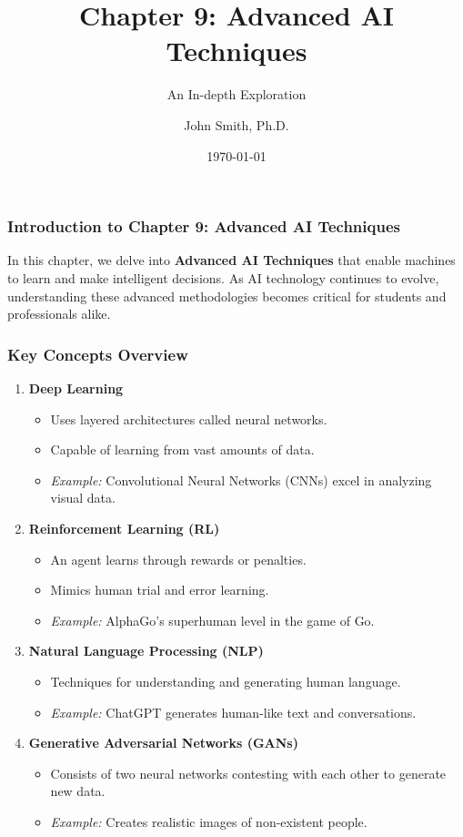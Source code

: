 \documentclass[aspectratio=169]{beamer}
\title[Advanced AI Techniques]{Chapter 9: Advanced AI Techniques}
\subtitle{An In-depth Exploration}
\author[J. Smith]{John Smith, Ph.D.}
\institute[University Name]{
  Department of Computer Science\\
  University Name\\
  \vspace{0.3cm}
  Email: email@university.edu\\
  Website: www.university.edu
}
\date{\today}
\begin{document}
\frame{\titlepage}

\begin{frame}[fragile]
    \frametitle{Introduction to Chapter 9: Advanced AI Techniques}
    In this chapter, we delve into \textbf{Advanced AI Techniques} that enable machines to learn and make intelligent decisions. 
    As AI technology continues to evolve, understanding these advanced methodologies becomes critical for students and professionals alike.
\end{frame}

\begin{frame}[fragile]
    \frametitle{Key Concepts Overview}
    \begin{enumerate}
        \item \textbf{Deep Learning}
            \begin{itemize}
                \item Uses layered architectures called neural networks.
                \item Capable of learning from vast amounts of data.
                \item \textit{Example:} Convolutional Neural Networks (CNNs) excel in analyzing visual data.
            \end{itemize}
        
        \item \textbf{Reinforcement Learning (RL)}
            \begin{itemize}
                \item An agent learns through rewards or penalties.
                \item Mimics human trial and error learning.
                \item \textit{Example:} AlphaGo's superhuman level in the game of Go.
            \end{itemize}
        
        \item \textbf{Natural Language Processing (NLP)}
            \begin{itemize}
                \item Techniques for understanding and generating human language.
                \item \textit{Example:} ChatGPT generates human-like text and conversations.
            \end{itemize}
        
        \item \textbf{Generative Adversarial Networks (GANs)}
            \begin{itemize}
                \item Consists of two neural networks contesting with each other to generate new data.
                \item \textit{Example:} Creates realistic images of non-existent people.
            \end{itemize}
    \end{enumerate}
\end{frame}
\end{document}
